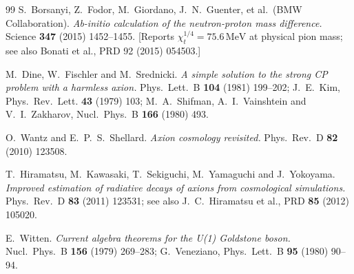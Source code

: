 \documentclass[11pt,a4paper]{article}
\theoremstyle{plain}
\theoremstyle{definition}
\theoremstyle{remark}
\begin{document}
\begin{thebibliography}{99}
S.~Borsanyi, Z.~Fodor, M.~Giordano, J.~N.~Guenter, et al.\ (BMW Collaboration).
\textit{Ab-initio calculation of the neutron-proton mass difference.}
Science \textbf{347} (2015) 1452--1455.
[Reports $\chi_t^{1/4} = 75.6\,\mathrm{MeV}$ at physical pion mass; see also Bonati et al., PRD 92 (2015) 054503.]

M.~Dine, W.~Fischler and M.~Srednicki.
\textit{A simple solution to the strong CP problem with a harmless axion.}
Phys.~Lett.~B \textbf{104} (1981) 199--202;
J.~E.~Kim, Phys.~Rev.~Lett. \textbf{43} (1979) 103;
M.~A.~Shifman, A.~I.~Vainshtein and V.~I.~Zakharov, Nucl.~Phys.~B \textbf{166} (1980) 493.

O.~Wantz and E.~P.~S.~Shellard.
\textit{Axion cosmology revisited.}
Phys.~Rev.~D \textbf{82} (2010) 123508.

T.~Hiramatsu, M.~Kawasaki, T.~Sekiguchi, M.~Yamaguchi and J.~Yokoyama.
\textit{Improved estimation of radiative decays of axions from cosmological simulations.}
Phys.~Rev.~D \textbf{83} (2011) 123531;
see also J.~C.~Hiramatsu et al., PRD \textbf{85} (2012) 105020.

E.~Witten.
\textit{Current algebra theorems for the U(1) Goldstone boson.}
Nucl.~Phys.~B \textbf{156} (1979) 269--283;
G.~Veneziano, Phys.~Lett.~B \textbf{95} (1980) 90--94.

\end{thebibliography}
\end{document}
